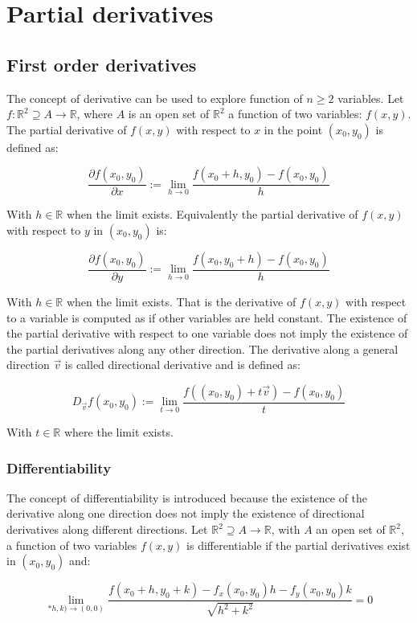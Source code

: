 \chapter{Partial derivatives}

\section{First order derivatives}
The concept of derivative can be used to explore function of $n\ge 2$ variables.
Let $f:\mathbb{R}^2\supseteq A\rightarrow \mathbb{R}$, where $A$ is an open set of $\mathbb{R}^2$ a function of two variables: $f(x, y)$.
The partial derivative of $f(x,y)$ with respect to $x$ in the point $(x_0, y_0)$ is defined as:

$$\frac{\partial f(x_0, y_0)}{\partial x} := \lim\limits_{h\rightarrow 0}\frac{f(x_0+h, y_0) -f(x_0, y_0)}{h}$$

With $h\in\mathbb{R}$ when the limit exists.
Equivalently the partial derivative of $f(x, y)$ with respect to $y$ in $(x_0, y_0)$ is:

$$\frac{\partial f(x_0, y_0)}{\partial y} := \lim\limits_{h\rightarrow 0}\frac{f(x_0, y_0+h) -f(x_0, y_0)}{h}$$

With $h\in\mathbb{R}$ when the limit exists.
That is the derivative of $f(x,y)$ with respect to a variable is computed as if other variables are held constant.
The existence of the partial derivative with respect to one variable does not imply the existence of the partial derivatives along any other direction.
The derivative along a general direction $\vec{v}$ is called directional derivative and is defined as:

$$D_{\vec{v}}f(x_0, y_0) := \lim\limits_{t\rightarrow 0}\frac{f((x_0, y_0) + t\vec{v}) - f(x_0, y_0)}{t}$$

With $t\in\mathbb{R}$ where the limit exists.

	\subsection{Differentiability}
	The concept of differentiability is introduced because the existence of the derivative along one direction does not imply the existence of directional derivatives along different directions.
	Let $\mathbb{R}^2\supseteq A\rightarrow\mathbb{R}$, with $A$ an open set of $\mathbb{R}^2$, a function of two variables $f(x,y)$ is differentiable if the partial derivatives exist in $(x_0, y_0)$ and:

	$$\lim\limits_{*h,k)\rightarrow(0,0)}\frac{f(x_0+h, y_0+k) - f_x(x_0, y_0)h - f_y(x_0, y_0)k}{\sqrt{h^2+k^2}} = 0$$

